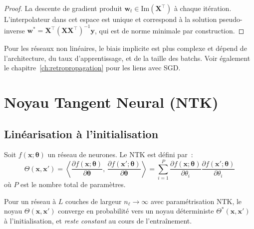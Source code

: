 \begin{proof}
La descente de gradient produit $\mathbf{w}_t \in \text{Im}(\mathbf{X}^\top)$
\`a chaque it\'eration. L'interpolateur dans cet espace est unique et
correspond \`a la solution pseudo-inverse $\mathbf{w}^* = \mathbf{X}^\top(\mathbf{X}\mathbf{X}^\top)^{-1}\mathbf{y}$,
qui est de norme minimale par construction.
\end{proof}

\begin{remarque}
Pour les r\'eseaux non lin\'eaires, le biais implicite est plus complexe
et d\'epend de l'architecture, du taux d'apprentissage, et de la taille
des batchs. Voir \'egalement le chapitre~\ref{ch:retropropagation} pour
les liens avec SGD.
\end{remarque}

\section{Noyau Tangent Neural (NTK)}
\label{sec:ntk}

\subsection{Lin\'earisation \`a l'initialisation}

\begin{definition}
\label{def:ntk}
Soit $f(\mathbf{x}; \boldsymbol{\theta})$ un r\'eseau de neurones. Le NTK
est d\'efini par~:
\begin{equation}
\Theta(\mathbf{x}, \mathbf{x}') = \left\langle \frac{\partial f(\mathbf{x}; \boldsymbol{\theta})}{\partial \boldsymbol{\theta}},\, \frac{\partial f(\mathbf{x}'; \boldsymbol{\theta})}{\partial \boldsymbol{\theta}} \right\rangle = \sum_{i=1}^{P} \frac{\partial f(\mathbf{x}; \boldsymbol{\theta})}{\partial \theta_i} \frac{\partial f(\mathbf{x}'; \boldsymbol{\theta})}{\partial \theta_i}
\end{equation}
o\`u $P$ est le nombre total de param\`etres.
\end{definition}

\begin{theoreme}
\label{thm:ntk-convergence}
Pour un r\'eseau \`a $L$ couches de largeur $n_\ell \to \infty$ avec
param\'etrisation NTK, le noyau $\Theta(\mathbf{x}, \mathbf{x}')$
converge en probabilit\'e vers un noyau d\'eterministe $\Theta^*(\mathbf{x}, \mathbf{x}')$
\`a l'initialisation, et \emph{reste constant} au cours de l'entra\^inement.
\end{theoreme}

